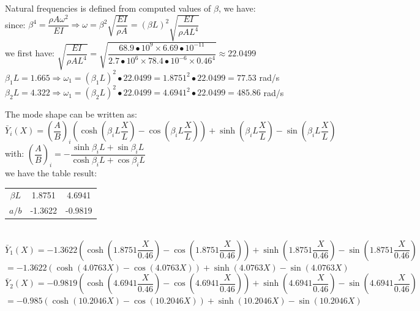 \documentclass[14pt,a4paper]{article}
\begin{document}
\begin{enumerate}
	Natural frequencies is defined from computed values of $\beta$, we have:\\
	since: $ \beta^4 = \dfrac{\rho A\omega^2}{EI} \Rightarrow \omega = \beta^2\sqrt{\dfrac{EI}{\rho A}} = (\beta L)^2\sqrt{\dfrac{EI}{\rho AL^4}}$\\
	we first have: $\sqrt{\dfrac{EI}{\rho AL^4}} = \sqrt{\dfrac{68.9\bullet 10^9 \times 6.69\bullet 10^{-11}}{2.7\bullet10^6 \times 78.4\bullet10^{-6}\times 0.46^4}} \approx 22.0499$\\
	\hspace*{1cm} $\beta_1L = 1.665 \Rightarrow \omega_1 = (\beta_1L)^2\bullet 22.0499 = 1.8751^2\bullet 22.0499 = 77.53$ rad/s\\
	\hspace*{1cm} $\beta_2L = 4.322 \Rightarrow \omega_1 = (\beta_2L)^2\bullet 22.0499 = 4.6941^2\bullet 22.0499 = 485.86$ rad/s
	
	The mode shape can be written as:\\
	$\bar{Y}_i(X) = \left(\dfrac{A}{B}\right)_i\left(\cosh(\beta_iL\dfrac{X}{L}) - \cos(\beta_iL\dfrac{X}L)\right) + \sinh(\beta_iL\dfrac{X}{L}) - \sin(\beta_iL\dfrac{X}{L})$\\
	with: 	$\left(\dfrac{A}{B}\right)_i =  -\dfrac{ \sinh\beta_iL + \sin \beta_iL}{\cosh \beta_iL + \cos \beta_iL} $\\
	we have the table result:
	\begin{tabular} {c c c}
		$\beta L$ & 1.8751 & 4.6941 \\
		$a/b$ & -1.3622 & -0.9819 
	\end{tabular}\\
	$\bar{Y}_1(X) = -1.3622\left(\cosh(1.8751\dfrac{X}{0.46}) - \cos(1.8751\dfrac{X}{0.46})\right) + \sinh(1.8751\dfrac{X}{0.46}) - \sin(1.8751\dfrac{X}{0.46})$\\	
	\hspace*{0.9cm} $= -1.3622\left(\cosh(4.0763X) - \cos(4.0763X)\right) + \sinh(4.0763X) - \sin(4.0763X)$\\	
	$\bar{Y}_2(X) = -0.9819\left(\cosh(4.6941\dfrac{X}{0.46}) - \cos(4.6941\dfrac{X}{0.46})\right) + \sinh(4.6941\dfrac{X}{0.46}) - \sin(4.6941\dfrac{X}{0.46})$\\	
	\hspace*{0.9cm} $= -0.985\left(\cosh(10.2046X) - \cos(10.2046X)\right) + \sinh(10.2046X) - \sin(10.2046X)$\\
	

\end{enumerate}
\end{document}
